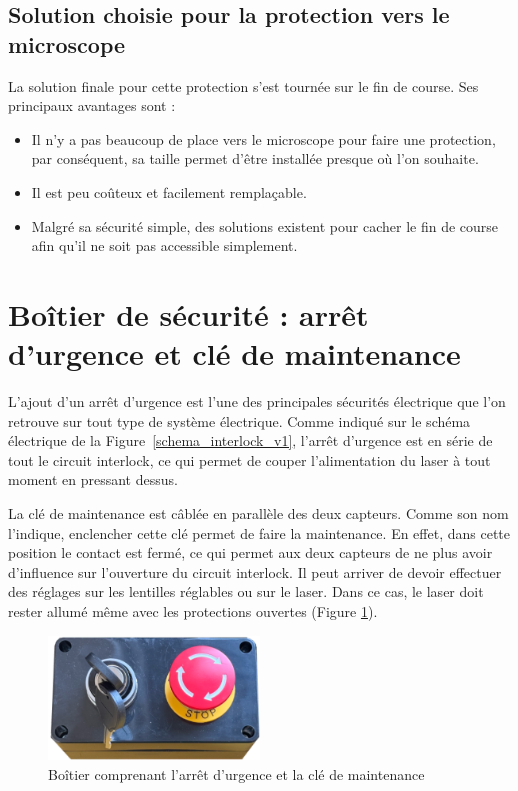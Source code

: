 \subsection{Solution choisie pour la protection vers le microscope}
La solution finale pour cette protection s'est tournée sur le fin de course. Ses principaux avantages sont  :
\begin{itemize}[label=\textbullet]
    \item Il n'y a pas beaucoup de place vers le microscope pour faire une protection, par conséquent, sa taille permet d'être installée presque où l'on souhaite.
    \item Il est peu coûteux et facilement remplaçable.
    \item Malgré sa sécurité simple, des solutions existent pour cacher le fin de course afin qu'il ne soit pas accessible simplement.
\end{itemize}

\section{Boîtier de sécurité : arrêt d'urgence et clé de maintenance}
\label{subsec:arret_urgence_maintenance}
L'ajout d'un arrêt d'urgence est l'une des principales sécurités électrique que l'on retrouve sur tout type de système électrique. Comme indiqué sur le schéma électrique de la Figure~\ref{schema_interlock_v1}, l'arrêt d'urgence est en série de tout le circuit interlock, ce qui permet de couper l'alimentation du laser à tout moment en pressant dessus.

La clé de maintenance est câblée en parallèle des deux capteurs. Comme son nom l'indique, enclencher cette clé permet de faire la maintenance. En effet, dans cette position le contact est fermé, ce qui permet aux deux capteurs de ne plus avoir d'influence sur l'ouverture du circuit interlock. Il peut arriver de devoir effectuer des réglages sur les lentilles réglables ou sur le laser. Dans ce cas, le laser doit rester allumé même avec les protections ouvertes (Figure \ref{boitier_arret_urgence_maintenance}).

\begin{figure}[H]
    \begin{center}
        \includegraphics[width=0.5\textwidth]{assets/figures/Protections_laser/Securite_electrique/boitier_arret_urgence_maintenance.png}
    \end{center}
    \caption{Boîtier comprenant l'arrêt d'urgence et la clé de maintenance}
    \label{boitier_arret_urgence_maintenance}
\end{figure}

